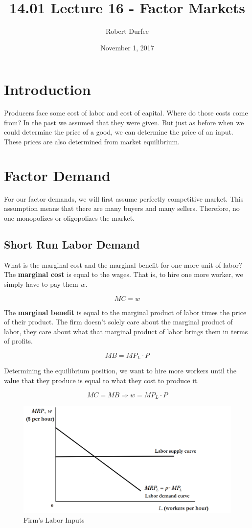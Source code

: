 \documentclass{article}
\title{14.01 Lecture 16 - Factor Markets}
\author{Robert Durfee}
\date{November 1, 2017}
\begin{document}
\maketitle

\section{Introduction}

Producers face some cost of labor and cost of capital. Where do those costs come from? In the past we assumed that they were given. But just as before when we could determine the price of a good, we can determine the price of an input. These prices are also determined from market equilibrium. 

\section{Factor Demand}

For our factor demands, we will first assume perfectly competitive market. This assumption means that there are many buyers and many sellers. Therefore, no one monopolizes or oligopolizes the market.

\subsection{Short Run Labor Demand}

What is the marginal cost and the marginal benefit for one more unit of labor? The \textbf{marginal cost} is equal to the wages. That is, to hire one more worker, we simply have to pay them $w$.

$$MC=w$$

The \textbf{marginal benefit} is equal to the marginal product of labor times the price of their product. The firm doesn't solely care about the marginal product of labor, they care about what that marginal product of labor brings them in terms of profits.

$$MB=MP_{L}\cdot P$$

Determining the equilibrium position, we want to hire more workers until the value that they produce is equal to what they cost to produce it.


$$MC=MB\Rightarrow w=MP_{L}\cdot P$$

\begin{figure}
    \centering
    \includegraphics[scale=0.33]{"Figure 16-1"}
    \caption{Firm's Labor Inputs}
\end{figure}
\end{document}
